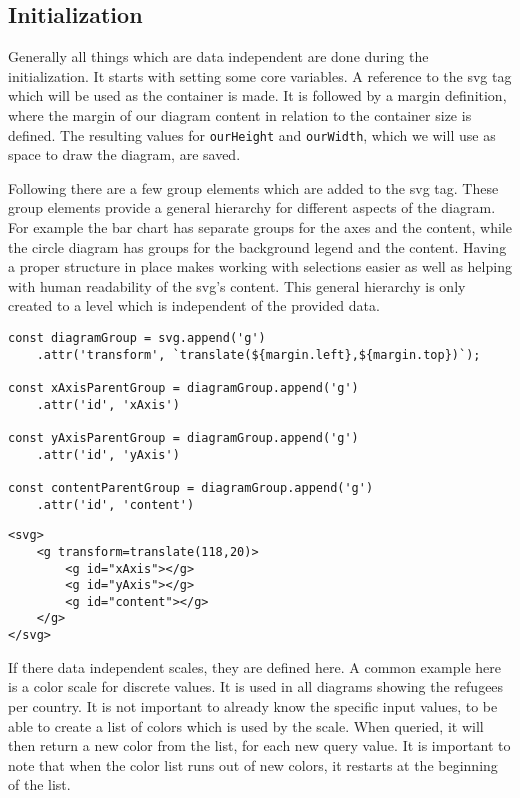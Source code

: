 \subsection{Initialization}
Generally all things which are data independent are done during the initialization. It starts with setting some core variables. A reference to the svg tag which will be used as the container is made. It is followed by a margin definition, where the margin of our diagram content in relation to the container size is defined. The resulting values for \verb|ourHeight| and \verb|ourWidth|, which we will use as space to draw the diagram, are saved. 

Following there are a few group elements which are added to the svg tag. These group elements provide a general hierarchy for different aspects of the diagram. For example the bar chart has separate groups for the axes and the content, while the circle diagram has groups for the background legend and the content. Having a proper structure in place makes working with selections easier as well as helping with human readability of the svg's content. This general hierarchy is only created to a level which is independent of the provided data.

\begin{minipage}{\linewidth}
\begin{lstlisting}[style=htmlcssjs, caption={JavaScript code to create the hierarchy as used in the bar-chart}, label={hierarchy_creation}]
const diagramGroup = svg.append('g')
    .attr('transform', `translate(${margin.left},${margin.top})`);

const xAxisParentGroup = diagramGroup.append('g')
    .attr('id', 'xAxis')

const yAxisParentGroup = diagramGroup.append('g')
    .attr('id', 'yAxis')

const contentParentGroup = diagramGroup.append('g')
    .attr('id', 'content')
\end{lstlisting}
\begin{lstlisting}[style=htmlcssjs, caption={Resulting HTML structure}, label={hierarchy_result}]
<svg>
    <g transform=translate(118,20)>
        <g id="xAxis"></g>
        <g id="yAxis"></g>
        <g id="content"></g>
    </g>
</svg>
    \end{lstlisting}
\end{minipage}


If there data independent scales, they are defined here. A common example here is a color scale for discrete values. It is used in all diagrams showing the refugees per country. It is not important to already know the specific input values, to be able to create a list of colors which is used by the scale. When queried, it will then return a new color from the list, for each new query value. It is important to note that when the color list runs out of new colors, it restarts at the beginning of the list.

